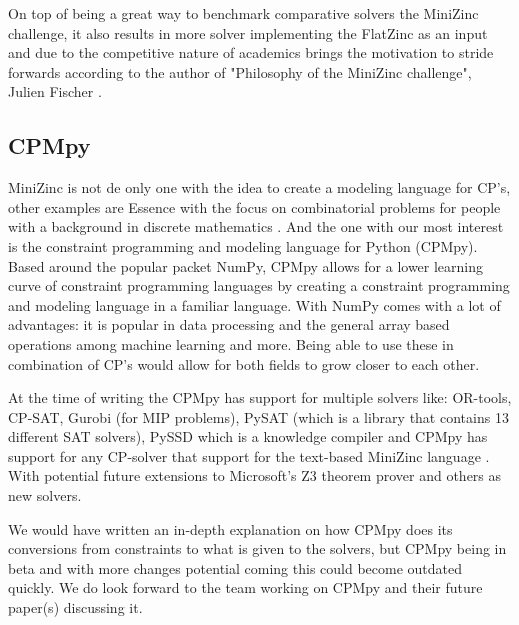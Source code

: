 On top of being a great way to benchmark comparative solvers the MiniZinc challenge, it also results in more solver implementing the FlatZinc as an input and due to the competitive nature of academics brings the motivation to stride forwards according to the author of "Philosophy of the MiniZinc challenge", Julien Fischer \cite{59stuckey2010philosophy}.

\subsection{CPMpy}
\label{CP:CPMpy}
MiniZinc is not de only one with the idea to create a modeling language for CP's, other examples are Essence with the focus on combinatorial problems for people with a background in discrete mathematics \cite{70frisch2008essence}.
And the one with our most interest is the constraint programming and modeling language for Python (CPMpy). Based around the popular packet NumPy, CPMpy allows for a lower learning curve of constraint programming languages by creating a constraint programming and modeling language in a familiar language\cite{17guns2019increasing}. 
With NumPy comes with a lot of advantages: it is popular in data processing and the general array based operations among machine learning and more. 
Being able to use these in combination of CP's would allow for both fields to grow closer to each other. 

At the time of writing the CPMpy has support for multiple solvers like: OR-tools, CP-SAT, Gurobi (for MIP problems), PySAT (which is a library that contains 13 different SAT solvers), PySSD which is a knowledge compiler  and CPMpy has support for any CP-solver that support for the text-based MiniZinc language \cite{CPMpyDoc, CPMpyGithub}. With potential future extensions to Microsoft's Z3 theorem prover and others as new solvers.

We would have written an in-depth explanation on how CPMpy does its conversions from constraints to what is given to the solvers, but CPMpy being in beta and with more changes potential coming this could become outdated quickly. We do look forward to the team working on CPMpy and their future paper(s) discussing it.

